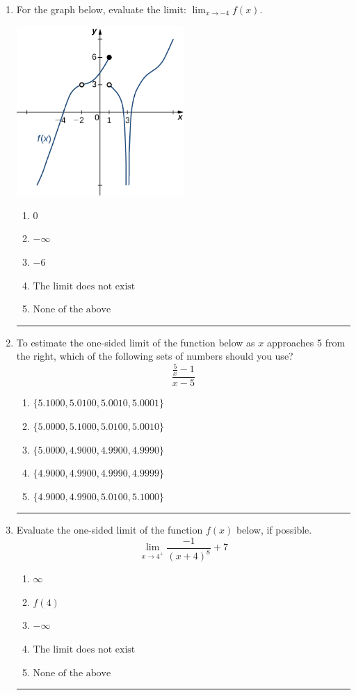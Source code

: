 \documentclass[14pt]{extbook}
\newcommand{\litem}[1]{\item#1\hspace*{-1cm}\rule{\textwidth}{0.4pt}}
\begin{document}
\begin{enumerate}
{\begin{enumerate}[label=\Alph*.]
\end{enumerate} }
\litem{
For the graph below, evaluate the limit: $ \displaystyle \lim_{x \rightarrow -4} f(x)$.
\begin{center}
    \includegraphics[width=0.5\textwidth]{../Figures/evaluateLimitGraphicallyB.png}
\end{center}
\begin{enumerate}[label=\Alph*.]
\item \( 0 \)
\item \( -\infty \)
\item \( -6 \)
\item \( \text{The limit does not exist} \)
\item \( \text{None of the above} \)

\end{enumerate} }
\litem{
To estimate the one-sided limit of the function below as $x$ approaches 5 from the right, which of the following sets of numbers should you use?\[ \frac{\frac{5}{x} - 1}{x - 5} \]\begin{enumerate}[label=\Alph*.]
\item \( \{ 5.1000, 5.0100, 5.0010, 5.0001 \} \)
\item \( \{ 5.0000, 5.1000, 5.0100, 5.0010 \} \)
\item \( \{ 5.0000, 4.9000, 4.9900, 4.9990 \} \)
\item \( \{ 4.9000, 4.9900, 4.9990, 4.9999 \} \)
\item \( \{ 4.9000, 4.9900, 5.0100, 5.1000 \} \)

\end{enumerate} }
\litem{
Evaluate the one-sided limit of the function $f(x)$ below, if possible.\[ \lim_{x \rightarrow 4^+} \frac{-1}{(x+4)^8}+7 \]\begin{enumerate}[label=\Alph*.]
\item \( \infty \)
\item \( f(4) \)
\item \( -\infty \)
\item \( \text{The limit does not exist} \)
\item \( \text{None of the above} \)

\end{enumerate} }
\end{enumerate}
\end{document}
